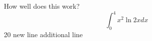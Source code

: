 \documentclass{article}
\begin{document}
How well does this work?
$$\int_0^4 x^2 \ln{2x}dx$$
20
new line
additional line
\end{document}
